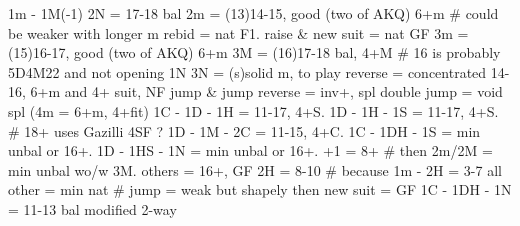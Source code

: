 1m - 1M(-1)
2N = 17-18 bal
2m = (13)14-15, good (two of AKQ) 6+m  # could be weaker with longer m
    rebid = nat F1. raise & new suit = nat GF
3m = (15)16-17, good (two of AKQ) 6+m
3M = (16)17-18 bal, 4+M  # 16 is probably 5D4M22 and not opening 1N
3N = (s)solid m, to play
reverse = concentrated 14-16, 6+m and 4+ suit, NF
jump & jump reverse = inv+, spl
double jump = void spl (4m = 6+m, 4+fit)
1C - 1D - 1H = 11-17, 4+S. 1D - 1H - 1S = 11-17, 4+S.  # 18+ uses Gazilli
    4SF ?
1D - 1M - 2C = 11-15, 4+C.
1C - 1DH - 1S = min unbal or 16+. 1D - 1HS - 1N = min unbal or 16+.
    +1 = 8+  # then 2m/2M = min unbal wo/w 3M. others = 16+, GF 
    2H = 8-10  # because 1m - 2H = 3-7
    all other = min nat  # jump = weak but shapely
        then new suit = GF
1C - 1DH - 1N = 11-13 bal
    modified 2-way
